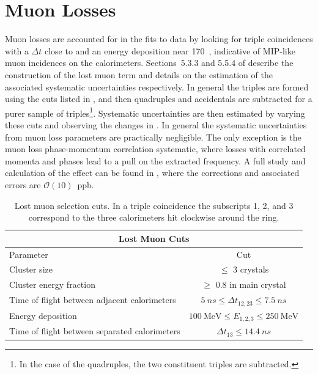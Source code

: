 
\graphicspath{{Body/Figures/MuonLosses/}}

\section{Muon Losses}


Muon losses are accounted for in the fits to data by looking for triple coincidences with a $\Delta t$ close to  and an energy deposition near 170~\MeV, indicative of MIP-like muon incidences on the calorimeters. Sections~5.3.3 and 5.5.4 of  describe the construction of the lost muon term and details on the estimation of the associated systematic uncertainties respectively. In general the triples are formed using the cuts listed in , and then quadruples and accidentals are subtracted for a purer sample of triples\footnote{In the case of the quadruples, the two constituent triples are subtracted.}. Systematic uncertainties are then estimated by varying these cuts and observing the changes in \R. In general the systematic uncertainties from muon loss parameters are practically negligible. The only exception is the muon loss phase-momentum correlation systematic, where losses with correlated momenta and phases lead to a pull on the extracted \wa frequency. A full study and calculation of the effect can be found in , where the corrections and associated errors are $\mathcal{O}(10)$~ppb.



\begin{table}[h]
\centering
\setlength\tabcolsep{10pt}
\renewcommand{\arraystretch}{1.2}
\begin{tabular*}{1\linewidth}{@{\extracolsep{\fill}}lc}
  \hline
    \multicolumn{2}{c}{\textbf{Lost Muon Cuts}} \\
  \hline\hline
    Parameter & Cut \\
  \hline
    Cluster size & $\leq$ 3 crystals \\
    Cluster energy fraction & $\geq$ 0.8 in main crystal \\
    Time of flight between adjacent calorimeters & $\SI{5}{ns} \leq \Delta t_{12, 23} \leq \SI{7.5}{ns}$ \\
    Energy deposition & $\SI{100}{\MeV} \leq E_{1,2,3} \leq \SI{250}{\MeV}$ \\
    Time of flight between separated calorimeters & $\Delta t_{13} \leq \SI{14.4}{ns}$ \\
  \hline 
\end{tabular*}
\caption[Lost muon cuts]{Lost muon selection cuts. In a triple coincidence the subscripts 1, 2, and 3 correspond to the three calorimeters hit clockwise around the ring.}
\label{tab:lostmuoncuts}
\end{table}



